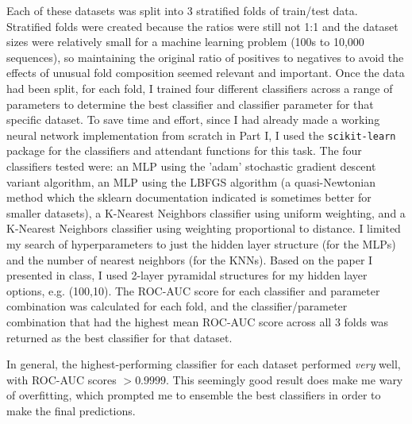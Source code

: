 \documentclass[12pt]{article}
\begin{document}
Each of these datasets was split into 3 stratified folds of train/test data. Stratified folds were created because the ratios were still not 1:1 and the dataset sizes were relatively small for a machine learning problem (100s to 10,000 sequences), so maintaining the original ratio of positives to negatives to avoid the effects of unusual fold composition seemed relevant and important. Once the data had been split, for each fold, I trained four different classifiers across a range of parameters to determine the best classifier and classifier parameter for that specific dataset. To save time and effort, since I had already made a working neural network implementation from scratch in Part I, I used the \verb|scikit-learn| package for the classifiers and attendant functions for this task. The four classifiers tested were: an MLP using the 'adam' stochastic gradient descent variant algorithm, an MLP using the LBFGS algorithm (a quasi-Newtonian method which the sklearn documentation indicated is sometimes better for smaller datasets), a K-Nearest Neighbors classifier using uniform weighting, and a K-Nearest Neighbors classifier using weighting proportional to distance. I limited my search of hyperparameters to just the hidden layer structure (for the MLPs) and the number of nearest neighbors (for the KNNs). Based on the paper I presented in class, I used 2-layer pyramidal structures for my hidden layer options, e.g. (100,10). The ROC-AUC score for each classifier and parameter combination was calculated for each fold, and the classifier/parameter combination that had the highest mean ROC-AUC score across all 3 folds was returned as the best classifier for that dataset. 
\par In general, the highest-performing classifier for each dataset performed {\it very} well, with ROC-AUC scores $>0.9999$. This seemingly good result does make me wary of overfitting, which prompted me to ensemble the best classifiers in order to make the final predictions.
\end{document}
